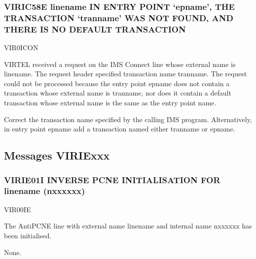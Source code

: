 \documentclass[letterpaper,10pt,english]{sphinxmanual}
\begin{document}
\subsubsection{VIRIC58E linename IN ENTRY POINT ‘epname’, THE TRANSACTION ‘tranname’ WAS NOT FOUND, AND THERE IS NO DEFAULT TRANSACTION}
\label{\detokenize{messages:viric58e-linename-in-entry-point-epname-the-transaction-tranname-was-not-found-and-there-is-no-default-transaction}}\begin{description}
\sphinxAtStartPar
VIR0ICON

\sphinxAtStartPar
VIRTEL received a request on the IMS Connect line whose external name is linename. The request header specified transaction name tranname. The request could not be processed because the entry point epname does not contain a transaction whose external name is tranname, nor does it contain a default transaction whose external name is the same as the entry point name.

\sphinxAtStartPar
Correct the transaction name specified by the calling IMS program. Alternatively, in entry point epname add a transaction named either tranname or epname.

\end{description}


\subsection{Messages VIRIExxx}
\label{\detokenize{messages:messages-viriexxx}}

\subsubsection{VIRIE01I INVERSE PCNE INITIALISATION FOR linename (n\sphinxhyphen{}xxxxxx)}
\label{\detokenize{messages:virie01i-inverse-pcne-initialisation-for-linename-n-xxxxxx}}\begin{description}
\sphinxAtStartPar
VIR00IE

\sphinxAtStartPar
The AntiPCNE line with external name linename and internal name n\sphinxhyphen{}xxxxxx has been initialised.

\sphinxAtStartPar
None.

\end{description}
\end{document}
